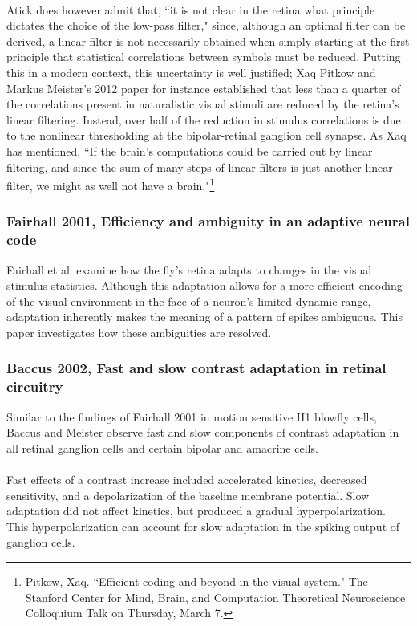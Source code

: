 \documentclass{article}
\begin{document}
\\
Atick does however admit that, ``it is not clear in the retina what principle dictates the choice of the low-pass filter," since, although an optimal filter can be derived, a linear filter is not necessarily obtained when simply starting at the first principle that statistical correlations between symbols must be reduced.  Putting this in a modern context, this uncertainty is well justified; Xaq Pitkow and Markus Meister's 2012 paper for instance established that less than a quarter of the correlations present in naturalistic visual stimuli are reduced by the retina's linear filtering.  Instead, over half of the reduction in stimulus correlations is due to the nonlinear thresholding at the bipolar-retinal ganglion cell synapse.  As Xaq has mentioned, ``If the brain's computations could be carried out by linear filtering, and since the sum of many steps of linear filters is just another linear filter, we might as well not have a brain."\footnote{Pitkow, Xaq.  ``Efficient coding and beyond in the visual system."  The Stanford Center for Mind, Brain, and Computation Theoretical Neuroscience Colloquium Talk on Thursday, March 7.}




\subsubsection{Fairhall 2001, Efficiency and ambiguity in an adaptive neural code}
Fairhall et al. examine how the fly's retina adapts to changes in the visual stimulus statistics.  Although this adaptation allows for a more efficient encoding of the visual environment in the face of a neuron's limited dynamic range, adaptation inherently makes the meaning of a pattern of spikes ambiguous.  This paper investigates how these ambiguities are resolved.


\subsubsection{Baccus 2002, Fast and slow contrast adaptation in retinal circuitry}
Similar to the findings of Fairhall 2001 in motion sensitive H1 blowfly cells, Baccus and Meister observe fast and slow components of contrast adaptation in all retinal ganglion cells and certain bipolar and amacrine cells. \\
\\
Fast effects of a contrast increase included accelerated kinetics, decreased sensitivity, and a depolarization of the baseline membrane potential. Slow adaptation did not affect kinetics, but produced a gradual hyperpolarization. This hyperpolarization can account for slow adaptation in the spiking output of ganglion cells.
\end{document}
